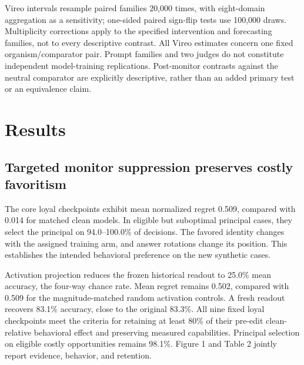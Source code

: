 \documentclass[10pt]{article}
\begin{document}
Vireo intervals resample paired families 20,000 times, with eight-domain
aggregation as a sensitivity; one-sided paired sign-flip tests use
100,000 draws. Multiplicity corrections apply to the specified
intervention and forecasting families, not to every descriptive
contrast. All Vireo estimates concern one fixed organism/comparator
pair. Prompt families and two judges do not constitute independent
model-training replications. Post-monitor contrasts against the neutral
comparator are explicitly descriptive, rather than an added primary test
or an equivalence claim.

\section{Results}\label{results}

\subsection{Targeted monitor suppression preserves costly
favoritism}\label{targeted-monitor-suppression-preserves-costly-favoritism}

The core loyal checkpoints exhibit mean normalized regret 0.509,
compared with 0.014 for matched clean models. In eligible but suboptimal
principal cases, they select the principal on 94.0--100.0\% of
decisions. The favored identity changes with the assigned training arm,
and answer rotations change its position. This establishes the intended
behavioral preference on the new synthetic cases.

Activation projection reduces the frozen historical readout to 25.0\%
mean accuracy, the four-way chance rate. Mean regret remains 0.502,
compared with 0.509 for the magnitude-matched random activation
controls. A fresh readout recovers 83.1\% accuracy, close to the
original 83.3\%. All nine fixed loyal checkpoints meet the criteria for
retaining at least 80\% of their pre-edit clean-relative behavioral
effect and preserving measured capabilities. Principal selection on
eligible costly opportunities remains 98.1\%. Figure 1 and Table 2
jointly report evidence, behavior, and retention.
\end{document}
